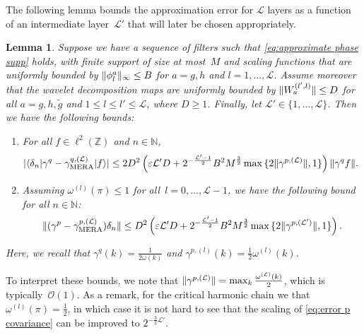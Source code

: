 \documentclass[submission, Phys]{SciPost}
\newtheorem{lem}{Lemma}\crefname{lem}{Lemma}{Lemmas}
\theoremstyle{definition}
\theoremstyle{remark}
\DeclareMathOperator{\mera}{MERA}
\DeclarePairedDelimiter{\abs}{\lvert}{\rvert}
\DeclarePairedDelimiter{\norm}{\lVert}{\rVert}
\DeclarePairedDelimiter{\braket}{\langle}{\rangle}
\newcommand{\ZZ}{\mathbb Z}
\newcommand{\NN}{\mathbb N}
\newcommand{\eps}{\varepsilon}
\newcommand{\cL}{\mathcal L}
\newcommand{\wnorm}{D}
\begin{document}
\begin{appendix}
\noindent
The following lemma bounds the approximation error for $\cL$ layers as a function of an intermediate layer~$\cL'$ that will later be chosen appropriately.

\begin{lem}\label{lem:multiple layer error}
Suppose we have a sequence of filters such that \cref{eq:approximate phase supp} holds, with finite support of size at most~$M$ and scaling functions that are uniformly bounded by $\norm{\phi^a_l}_\infty \leq B$ for $a=g,h$ and $l=1,\dots,\cL$.
Assume moreover that the wavelet decomposition maps are uniformly bounded by $\norm{W^{(l',l)}_a} \leq \wnorm$ for all $a = g,h,\tilde{g}$ and $1\leq l\leq l'\leq\cL$, where $D\geq1$.
Finally, let $\cL' \in \{1, \ldots, \cL\}$.
Then we have the following bounds:
\begin{enumerate}
\item For all $f \in \ell^2(\ZZ)$ and $n\in\NN$,
\begin{equation}\begin{aligned}\label{eq:error q covariance}
  \abs{\braket{\delta_n | \gamma^q - \gamma^{q,(\cL)}_{\mera} | f}}
&\leq 2 \wnorm^2 \left( \eps \cL' \wnorm + 2^{-\frac{\cL' - 1}{2}} B^2 M^{\frac32} \max \, \{2\norm{\gamma^{p,(\cL)}}, 1\} \right) \norm{\gamma^q f}.
\end{aligned}\end{equation}
\item Assuming $\omega^{(l)}(\pi) \leq 1$ for all~$l=0,\dots,\cL-1$, we have the following bound for all $n\in\NN$:
\begin{equation}\label{eq:error p covariance}
  \norm{(\gamma^p - \gamma^{p,(\cL)}_{\mera}) \delta_n}
\leq \wnorm^2 \left( \eps \cL' \wnorm + 2^{-\frac{\cL'-1}2} B^2 M^{\frac32} \max \, \{ 2\norm{\gamma^{p,(\cL')}}, 1 \} \right).
\end{equation}
\end{enumerate}
Here, we recall that $\gamma^q(k) = \frac1{2\omega(k)}$ and $\gamma^{p,(l)}(k) = \frac12 \omega^{(l)}(k)$.
\end{lem}

\noindent
To interpret these bounds, we note that $\norm{\gamma^{p,(\cL)}} = \max_k \frac{\omega^{(\cL)}(k)}2$, which is typically~$\mathcal O(1)$.
As a remark, for the critical harmonic chain we that $\omega^{(l)}(\pi) = \frac12$, in which case it is not hard to see that the scaling of \cref{eq:error p covariance} can be improved to $2^{-\frac32 \cL'}$.


\end{appendix}
\end{document}
